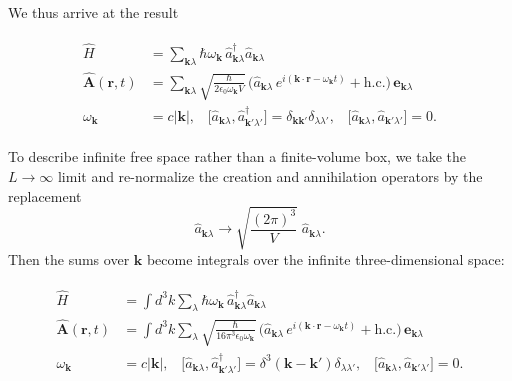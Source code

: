 \documentclass[prx,12pt]{revtex4-2}
\begin{document}
We thus arrive at the result
\begin{framed}
  \begin{align}
  \begin{aligned}
    \hat{H} &= \sum_{\mathbf{k}\lambda} \hbar \omega_{\mathbf{k}} \,
    \hat{a}^\dagger_{\mathbf{k}\lambda} \hat{a}_{\mathbf{k}\lambda} \\
  \hat{\mathbf{A}}(\mathbf{r},t) &= \sum_{\mathbf{k}\lambda} 
  \sqrt{\frac{\hbar}{2\epsilon_0\omega_{\mathbf{k}}V}}\,
  \Big(\hat{a}_{\mathbf{k}\lambda} \, e^{i(\mathbf{k}\cdot\mathbf{r} - \omega_{\mathbf{k}} t)}
  + \mathrm{h.c.}\Big)\, \mathbf{e}_{\mathbf{k}\lambda} \\
  \omega_{\mathbf{k}} &= c|\mathbf{k}|,  \;\;\;
  \big[\hat{a}_{\mathbf{k}\lambda}, \hat{a}_{\mathbf{k}'\lambda'}^\dagger\big]
  = \delta_{\mathbf{k}\mathbf{k}'} \delta_{\lambda\lambda'}, \;\;\;
  \big[\hat{a}_{\mathbf{k}\lambda}, \hat{a}_{\mathbf{k}'\lambda'}\big]
  = 0.
  \end{aligned}
  \label{qed1}
  \end{align}
\end{framed}
To describe infinite free space rather than a finite-volume box, we
take the $L\rightarrow \infty$ limit and re-normalize the creation and
annihilation operators by the replacement
\begin{equation}
  \hat{a}_{\mathbf{k}\lambda} \rightarrow \sqrt{\frac{(2\pi)^3}{V}} \;
  \hat{a}_{\mathbf{k}\lambda}.
\end{equation}
Then the sums over $\mathbf{k}$ become integrals over the infinite
three-dimensional space:
\begin{framed}
\begin{align}
  \begin{aligned}
    \hat{H} &= \int d^3k\sum_{\lambda} \hbar \omega_{\mathbf{k}} \,
    \hat{a}^\dagger_{\mathbf{k}\lambda} \hat{a}_{\mathbf{k}\lambda} \\
  \hat{\mathbf{A}}(\mathbf{r},t) &= \int d^3k \sum_{\lambda} 
  \sqrt{\frac{\hbar}{16\pi^3\epsilon_0\omega_{\mathbf{k}}}}\,
  \Big(\hat{a}_{\mathbf{k}\lambda} \, e^{i(\mathbf{k}\cdot\mathbf{r} - \omega_{\mathbf{k}} t)}
  + \mathrm{h.c.}\Big)\, \mathbf{e}_{\mathbf{k}\lambda} \\
  \omega_{\mathbf{k}} &= c|\mathbf{k}|,  \;\;\;
  \big[\hat{a}_{\mathbf{k}\lambda}, \hat{a}_{\mathbf{k}'\lambda'}^\dagger\big]
  = \delta^3(\mathbf{k}-\mathbf{k}') \delta_{\lambda\lambda'}, \;\;\;
  \big[\hat{a}_{\mathbf{k}\lambda}, \hat{a}_{\mathbf{k}'\lambda'}\big]
  = 0.
  \end{aligned}
  \label{qed2}
\end{align}
\end{framed}
\end{document}
